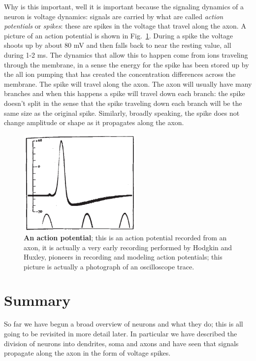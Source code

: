 \documentclass[12pt]{article}
\begin{document}
Why is this important, well it is important because the signaling
dynamics of a neuron is voltage dynamics: signals are carried by what
are called \textsl{action potentials} or \textsl{spikes}: these are
spikes in the voltage that travel along the axon. A picture of an
action potential is shown in Fig.~\ref{fig_hh}. During a spike the voltage
shoots up by about 80 mV and then falls back to near the resting
value, all during 1-2 ms. The dynamics that allow this to happen come
from ions traveling through the membrane, in a sense the energy for
the spike has been stored up by the all ion pumping that has created
the concentration differences across the membrane. The spike will
travel along the axon. The axon will usually have many branches and
when this happens a spike will travel down each branch: the spike
doesn't split in the sense that the spike traveling down each branch
will be the same size as the original spike. Similarly, broadly
speaking, the spike does not change amplitude or shape as it
propagates along the axon.


\begin{figure}[tbhp]
  \begin{center}
  \includegraphics[width=6cm]{action_potential.jpg}
\end{center}
  \caption{\textbf{An action potential}; this is an action potential recorded from an axon, it is actually a very early recording performed by Hodgkin and Huxley, pioneers in recording and modeling action potentials; this picture is actually a photograph of an oscilloscope trace. \label{fig_hh}}
\end{figure}

\section{Summary}

So far we have begun a broad overview of neurons and what they do;
this is all going to be revisited in more detail later. In particular
we have described the division of neurons into dendrites, soma and
axons and have seen that signals propagate along the axon in the form
of voltage spikes.
\end{document}
